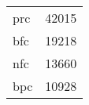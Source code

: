\begin{tabular}{lr}
\hline
 prc & 42015 \\
 bfc & 19218 \\
 nfc & 13660 \\
 bpc & 10928 \\
\hline
\end{tabular}
